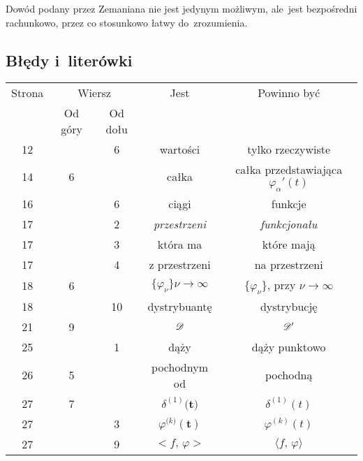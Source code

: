 \documentclass[a4paper,11pt]{article}
\numberwithin{equation}{section}
\begin{document}
Dowód podany przez Zemaniana nie jest jedynym możliwym, ale~jest
bezpośredni rachunkowo, przez co stosunkowo łatwy do~zrozumienia.





\subsection{Błędy i~literówki}

\label{sec:Bledy-i-literowski}

\VerSpaceThree


\begin{center}

  \begin{tabular}{|c|c|c|c|c|}
    \hline
    Strona & \multicolumn{2}{c|}{Wiersz} & Jest
                              & Powinno być \\ \cline{2-3}
    & Od góry & Od dołu & & \\
    \hline
    12  & & \hphantom{0}6 & wartości & tylko rzeczywiste \\
    14  & \hphantom{0}6 & & całka
    & całka przedstawiająca $\varphi_{ \alpha }'( t )$ \\
    16  & & \hphantom{0}6 & ciągi & funkcje \\
    17  & & \hphantom{0}2 & \textit{przestrzeni} & \textit{funkcjonału} \\
    17  & & \hphantom{0}3 & która ma & które mają \\
    17  & & \hphantom{0}4 & z przestrzeni & na przestrzeni \\
    18  & \hphantom{0}6 & & $\{ \varphi_{ \nu } \}\nu \to \infty$
    & $\{ \varphi_{ \nu } \}$, przy $\nu \to \infty$ \\
    18  & & 10 & dystrybuantę & dystrybucję \\
    21  & \hphantom{0}9 & & $\mathcal{D}$ & $\mathcal{D}'$ \\
    25  & & \hphantom{0}1 & dąży & dąży punktowo \\
    26  & \hphantom{0}5 & & pochodnym od & pochodną \\
    27  & \hphantom{0}7 & & $\delta^{ ( 1 ) }\boldsymbol{ ( t } )$
    & $\delta^{ ( 1 ) }( t )$ \\
    27  & & \hphantom{0}3 & $\varphi^{ ( k \boldsymbol{ ) } }\boldsymbol{ ( t ) } $
           & $\varphi^{ ( k ) }( t )$ \\
    27  & & \hphantom{0}9 & $< f,\, \varphi >$ & $\langle f, \, \varphi \rangle$ \\

\end{tabular}
\end{center}
\end{document}
